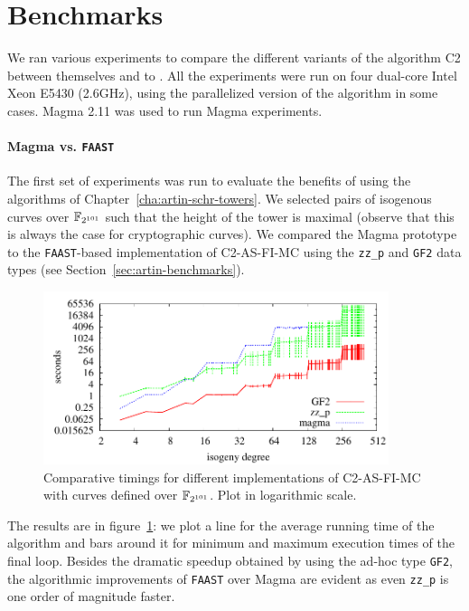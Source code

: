 \section{Benchmarks}
\label{sec:benchmarks}
We ran various experiments to compare the different variants of the
algorithm C2 between themselves and to
\hyperref[alg:le-si]{}. All the experiments were
run on four dual-core Intel Xeon E5430 (2.6GHz), using the
parallelized version of the algorithm in some cases. Magma 2.11 was
used to run Magma experiments.

\paragraph{Magma vs. \texttt{FAAST}}
\label{sec:magma-vs.-textttf}
The first set of experiments was run to evaluate the benefits of using
the algorithms of Chapter~\ref{cha:artin-schr-towers}. We selected
pairs of isogenous curves over $\mathbb{F}_{2^{101}}$ such that the height of
the tower is maximal (observe that this is always the case for
cryptographic curves).  We compared the Magma prototype to the
\texttt{FAAST}-based implementation of C2-AS-FI-MC using the
\texttt{zz\_p} and \texttt{GF2} data types (see
Section~\ref{sec:artin-benchmarks}).

\begin{figure}
  \centering
  \includegraphics[width=0.9\textwidth]{isogeny/p2}
  \caption{Comparative timings for different implementations of C2-AS-FI-MC with curves defined over $\mathbb{F}_{2^{101}}$. Plot in logarithmic scale.}
  \label{fig:2-101}
\end{figure}

The results are in figure~\ref{fig:2-101}: we plot a line for the
average running time of the algorithm and bars around it for minimum
and maximum execution times of the final loop. Besides the dramatic
speedup obtained by using the ad-hoc type \texttt{GF2}, the
algorithmic improvements of \texttt{FAAST} over Magma are evident as
even \texttt{zz\_p} is one order of magnitude faster.

